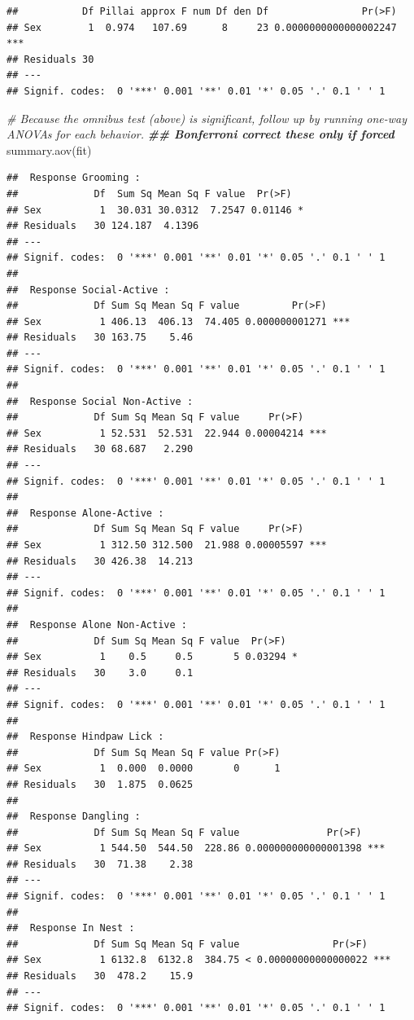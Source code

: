 \documentclass[
]{book}
\newenvironment{Shaded}{\begin{snugshade}}{\end{snugshade}}
\newcommand{\CommentTok}[1]{\textcolor[rgb]{0.56,0.35,0.01}{\textit{#1}}}
\newcommand{\DocumentationTok}[1]{\textcolor[rgb]{0.56,0.35,0.01}{\textbf{\textit{#1}}}}
\newcommand{\FunctionTok}[1]{\textcolor[rgb]{0.00,0.00,0.00}{#1}}
\newcommand{\NormalTok}[1]{#1}
\begin{document}
\begin{verbatim}
##           Df Pillai approx F num Df den Df                Pr(>F)    
## Sex        1  0.974   107.69      8     23 0.0000000000000002247 ***
## Residuals 30                                                        
## ---
## Signif. codes:  0 '***' 0.001 '**' 0.01 '*' 0.05 '.' 0.1 ' ' 1
\end{verbatim}

\begin{Shaded}
\begin{Highlighting}[]
\CommentTok{\# Because the omnibus test (above) is significant, follow up by running one{-}way ANOVAs for each behavior. }
\DocumentationTok{\#\# Bonferroni correct these only if forced}
\FunctionTok{summary.aov}\NormalTok{(fit)}
\end{Highlighting}
\end{Shaded}

\begin{verbatim}
##  Response Grooming :
##             Df  Sum Sq Mean Sq F value  Pr(>F)  
## Sex          1  30.031 30.0312  7.2547 0.01146 *
## Residuals   30 124.187  4.1396                  
## ---
## Signif. codes:  0 '***' 0.001 '**' 0.01 '*' 0.05 '.' 0.1 ' ' 1
## 
##  Response Social-Active :
##             Df Sum Sq Mean Sq F value         Pr(>F)    
## Sex          1 406.13  406.13  74.405 0.000000001271 ***
## Residuals   30 163.75    5.46                           
## ---
## Signif. codes:  0 '***' 0.001 '**' 0.01 '*' 0.05 '.' 0.1 ' ' 1
## 
##  Response Social Non-Active :
##             Df Sum Sq Mean Sq F value     Pr(>F)    
## Sex          1 52.531  52.531  22.944 0.00004214 ***
## Residuals   30 68.687   2.290                       
## ---
## Signif. codes:  0 '***' 0.001 '**' 0.01 '*' 0.05 '.' 0.1 ' ' 1
## 
##  Response Alone-Active :
##             Df Sum Sq Mean Sq F value     Pr(>F)    
## Sex          1 312.50 312.500  21.988 0.00005597 ***
## Residuals   30 426.38  14.213                       
## ---
## Signif. codes:  0 '***' 0.001 '**' 0.01 '*' 0.05 '.' 0.1 ' ' 1
## 
##  Response Alone Non-Active :
##             Df Sum Sq Mean Sq F value  Pr(>F)  
## Sex          1    0.5     0.5       5 0.03294 *
## Residuals   30    3.0     0.1                  
## ---
## Signif. codes:  0 '***' 0.001 '**' 0.01 '*' 0.05 '.' 0.1 ' ' 1
## 
##  Response Hindpaw Lick :
##             Df Sum Sq Mean Sq F value Pr(>F)
## Sex          1  0.000  0.0000       0      1
## Residuals   30  1.875  0.0625               
## 
##  Response Dangling :
##             Df Sum Sq Mean Sq F value               Pr(>F)    
## Sex          1 544.50  544.50  228.86 0.000000000000001398 ***
## Residuals   30  71.38    2.38                                 
## ---
## Signif. codes:  0 '***' 0.001 '**' 0.01 '*' 0.05 '.' 0.1 ' ' 1
## 
##  Response In Nest :
##             Df Sum Sq Mean Sq F value                Pr(>F)    
## Sex          1 6132.8  6132.8  384.75 < 0.00000000000000022 ***
## Residuals   30  478.2    15.9                                  
## ---
## Signif. codes:  0 '***' 0.001 '**' 0.01 '*' 0.05 '.' 0.1 ' ' 1
\end{verbatim}
\end{document}
